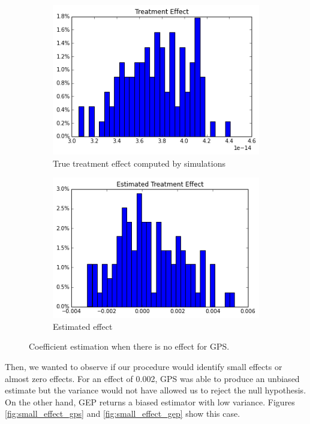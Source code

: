 \documentclass[11pt]{article}
\begin{document}
\begin{figure}[h]
\centering
\begin{subfigure}{.5\textwidth}
  \centering
  \includegraphics[width=.9\linewidth]{treatment_effect_no_influence_real.png}
  \caption{True treatment effect computed by simulations}
  \label{fig:sub1}
\end{subfigure}%
\begin{subfigure}{.5\textwidth}
  \centering
  \includegraphics[width=.9\linewidth]{estimated_no_influence_gep.png}
  \caption{Estimated effect}
  \label{fig:sub2}
\end{subfigure}
\caption{Coefficient estimation when there is no effect for GPS.}
\label{fig:no_effect_gep}
\end{figure}
\FloatBarrier
Then, we  wanted to observe if our procedure would identify small effects or almost zero effects. For an effect of 0.002, GPS was able to produce an unbiased estimate but the variance would not have allowed us to reject the null hypothesis. On the other hand, GEP returns a biased estimator with low variance. Figures \ref{fig:small_effect_gps} and \ref{fig:small_effect_gep} show this case. \\
\end{document}
